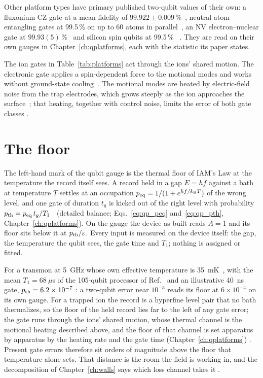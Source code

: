 \noindent Other platform types have primary published two-qubit values of their own: a fluxonium CZ gate at a mean fidelity of
$99.922\pm0.009$\,\%~\cite{Ding2023}, neutral-atom entangling gates at 99.5\,\% on up to 60 atoms in parallel~\cite{Evered2023}, an NV
electron--nuclear gate at $99.93(5)$\,\%~\cite{Bartling2025} and silicon spin qubits at 99.5\,\%~\cite{Xue2022,Noiri2022} \observed. They are read
on their own gauges in Chapter~\ref{ch:qplatforms}, each with the statistic its paper states.

The ion gates in Table~\ref{tab:platforms} act through the ions' shared motion. The electronic gate applies a
spin-dependent force to the motional modes and works without ground-state cooling~\cite{Hughes2025}. The motional
modes are heated by electric-field noise from the trap electrodes, which grows steeply as the ion approaches the
surface~\cite{Brownnutt2015}; that heating, together with control noise, limits the error of both gate classes \observed.

\section{The floor}\label{sec:qubitfloor}

The left-hand mark of the qubit gauge is the thermal floor of IAM's Law at the temperature the record itself sees. A record held in a gap
$E=hf$ against a bath at temperature $T$ settles at an occupation $p_{\rm eq}=1/(1+e^{hf/k_{\mathrm B} T})$ of the wrong level, and one gate of
duration $t_g$ is kicked out of the right level with probability $p_{\rm th}=p_{\rm eq}\,t_g/T_1$ \derived\ (detailed balance;
Eqs.~\eqref{eq:qp_peq} and~\eqref{eq:qp_pth}, Chapter~\ref{ch:qplatforms}). On the gauge the device as built reads $A=1$ and its floor sits
below it at $p_{\rm th}/\varepsilon$. Every input is measured on the device itself: the gap, the temperature the qubit sees, the gate time and
$T_1$; nothing is assigned or fitted.

For a transmon at 5~GHz whose own effective temperature is 35~mK~\cite{Jin2015}, with the mean $T_1=68~\mu$s of the 105-qubit processor of
Ref.~\cite{GoogleWillow2025} and an illustrative 40~ns gate, $p_{\rm th}=6.2\times10^{-7}$ \calc: a two-qubit error near $10^{-3}$ reads its
floor at $6\times10^{-4}$ on its own gauge. For a trapped ion the record is a hyperfine level pair that no bath thermalizes, so the floor of the
held record lies far to the left of any gate error; the gate runs through the ions' shared motion, whose thermal channel is the motional heating
described above, and the floor of that channel is set apparatus by apparatus by the heating rate and the gate time
(Chapter~\ref{ch:qplatforms}) \interp. Present gate errors therefore sit orders of magnitude above the floor that temperature alone sets. That
distance is the room the field is working in, and the decomposition of Chapter~\ref{ch:walls} says which loss channel takes it \interp.

